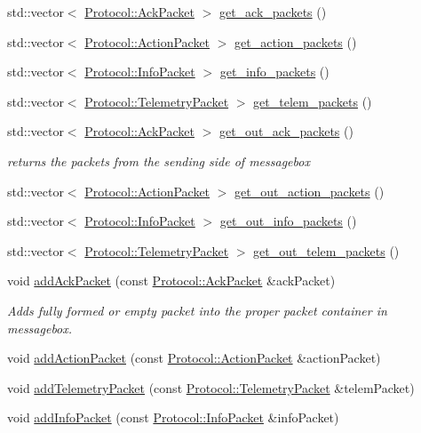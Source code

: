 \begin{DoxyCompactItemize}
std\+::vector$<$ \hyperlink{class_protocol_1_1_ack_packet}{Protocol\+::\+Ack\+Packet} $>$ \hyperlink{classmessagebox_abe5152230ef5e89e0839d9dd866590e5}{get\+\_\+ack\+\_\+packets} ()
\item 
std\+::vector$<$ \hyperlink{class_protocol_1_1_action_packet}{Protocol\+::\+Action\+Packet} $>$ \hyperlink{classmessagebox_afd08c7f717357ee71a666720ff6bb9bc}{get\+\_\+action\+\_\+packets} ()
\item 
std\+::vector$<$ \hyperlink{class_protocol_1_1_info_packet}{Protocol\+::\+Info\+Packet} $>$ \hyperlink{classmessagebox_a15a6793bc31aa9bb080c9fbcea14e1af}{get\+\_\+info\+\_\+packets} ()
\item 
std\+::vector$<$ \hyperlink{class_protocol_1_1_telemetry_packet}{Protocol\+::\+Telemetry\+Packet} $>$ \hyperlink{classmessagebox_a58df2b6675cad37e6f31b2bc25bcfb0e}{get\+\_\+telem\+\_\+packets} ()
\item 
std\+::vector$<$ \hyperlink{class_protocol_1_1_ack_packet}{Protocol\+::\+Ack\+Packet} $>$ \hyperlink{classmessagebox_aa19eb7d103c82c6edabe95052d71e957}{get\+\_\+out\+\_\+ack\+\_\+packets} ()
\begin{DoxyCompactList}\small\item\em returns the packets from the sending side of messagebox \end{DoxyCompactList}\item 
std\+::vector$<$ \hyperlink{class_protocol_1_1_action_packet}{Protocol\+::\+Action\+Packet} $>$ \hyperlink{classmessagebox_a49302f9e97d15853ab0bd4293cda3603}{get\+\_\+out\+\_\+action\+\_\+packets} ()
\item 
std\+::vector$<$ \hyperlink{class_protocol_1_1_info_packet}{Protocol\+::\+Info\+Packet} $>$ \hyperlink{classmessagebox_a8630b30babf0555dc17d150ccfe08d8f}{get\+\_\+out\+\_\+info\+\_\+packets} ()
\item 
std\+::vector$<$ \hyperlink{class_protocol_1_1_telemetry_packet}{Protocol\+::\+Telemetry\+Packet} $>$ \hyperlink{classmessagebox_a5ab4ee4ec8c63b6e4936fed1884fbd87}{get\+\_\+out\+\_\+telem\+\_\+packets} ()
\item 
void \hyperlink{classmessagebox_a356a1119d888a5aea5a70b67bce0132b}{add\+Ack\+Packet} (const \hyperlink{class_protocol_1_1_ack_packet}{Protocol\+::\+Ack\+Packet} \&ack\+Packet)
\begin{DoxyCompactList}\small\item\em Adds fully formed or empty packet into the proper packet container in messagebox. \end{DoxyCompactList}\item 
void \hyperlink{classmessagebox_a75d62bfa9db5b55a60b9e2e0fa164c81}{add\+Action\+Packet} (const \hyperlink{class_protocol_1_1_action_packet}{Protocol\+::\+Action\+Packet} \&action\+Packet)
\item 
void \hyperlink{classmessagebox_a27ac98af342131cd148fb4ed2261631f}{add\+Telemetry\+Packet} (const \hyperlink{class_protocol_1_1_telemetry_packet}{Protocol\+::\+Telemetry\+Packet} \&telem\+Packet)
\item 
void \hyperlink{classmessagebox_aa7a826742dd2a22376eaf787d510f064}{add\+Info\+Packet} (const \hyperlink{class_protocol_1_1_info_packet}{Protocol\+::\+Info\+Packet} \&info\+Packet)
\end{DoxyCompactItemize}
